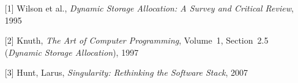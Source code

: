 \begin{itemize}
\item[{[1]}]
  Wilson et al.,
  \emph{Dynamic Storage Allocation: A Survey and Critical Review},
  1995
\item[{[2]}]
  Knuth,
  \emph{The Art of Computer Programming},
  Volume~1, Section~2.5 (\emph{Dynamic Storage Allocation}),
  1997
\item[{[3]}]
  Hunt, Larus,
  \emph{Singularity: Rethinking the Software Stack},
  2007
\end{itemize}




